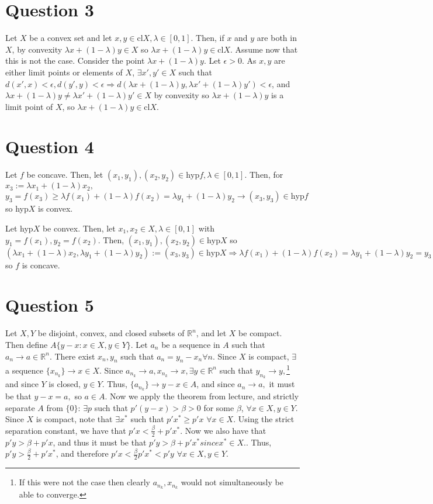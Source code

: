 \documentclass[11pt]{article} %
\begin{document}
\section{Question 3}
Let $X$ be a convex set and let $x,y\in \text{cl} X,\lambda \in [0,1].$ Then, if $x$ and $y$ are both in $X$, by convexity $\lambda x+(1-\lambda)y\in X$ so $\lambda x+(1-\lambda)y\in \text{cl}X$. Assume now that this is not the case. Consider the point $\lambda x+(1-\lambda)y.$ Let $\epsilon>0.$ As $x,y$ are either limit points or elements of $X$, $\exists x',y'\in X$ such that $d(x',x)<\epsilon,d(y',y)<\epsilon \Rightarrow d(\lambda x+(1-\lambda)y,\lambda x'+(1-\lambda)y')<\epsilon$, and $\lambda x+(1-\lambda)y \neq \lambda x'+(1-\lambda)y' \in X$ by convexity so $\lambda x+(1-\lambda)y$ is a limit point of $X$, so $\lambda x+(1-\lambda)y \in \text{cl}X$.

\section{Question 4}
Let $f$ be concave. Then, let $(x_1,y_1),(x_2,y_2) \in \text{hyp} f, \lambda \in [0,1].$ Then, for $x_3:=\lambda x_1 +(1-\lambda )x_2,$ $y_3 =f(x_3)\geq \lambda f(x_1) + (1-\lambda) f(x_2) = \lambda y_1 + (1-\lambda)y_2 \rightarrow (x_3,y_3) \in \text{hyp} f$ so hyp$X$ is convex.

Let hyp$X$ be convex. Then, let $x_1,x_2 \in X,\lambda \in [0,1]$ with $y_1 = f(x_1),y_2 = f(x_2)$. Then, $(x_1,y_1),(x_2,y_2) \in \text{hyp} X$ so $(\lambda x_1 + (1-\lambda)x_2 , \lambda y_1 + (1-\lambda)y_2):= (x_3,y_3) \in \text{hyp}X \Rightarrow \lambda f(x_1) + (1-\lambda)f(x_2)= \lambda y_1 + (1-\lambda)y_2 =y_3 \leq f(x_3) = f(\lambda x_1 + (1-\lambda)x_2 )$ so $f$ is concave.

\section{Question 5}
Let $X,Y$ be disjoint, convex, and closed subsets of $\mathbb{R}^n$, and let $X$ be compact. Then define $A \{ y-x : x\in X, y \in Y\}.$ Let $a_n$ be a sequence in $A$ such that $a_n \rightarrow a \in \mathbb{R}^n$. There exist $x_n,y_n$ such that $a_n = y_n - x_n \forall n.$ Since $X$ is compact, $\exists$ a sequence $\{ x_{n_k}\}\rightarrow x\in X$. Since $a_{n_k} \rightarrow a,x_{n_k} \rightarrow x, \exists y \in \mathbb{R}^n$ such that $y_{n_k} \rightarrow y,$\footnote{If this were not the case then clearly $a_{n_k},x_{n_k}$ would not simultaneously be able to converge.} and since $Y$ is closed, $y\in Y$. Thus, $\{ a_{n_k} \} \rightarrow y-x \in A$, and since $a_n \rightarrow a,$ it must be that $y-x = a,$ so $a \in A$. Now we apply the theorem from lecture, and strictly separate $A$ from $\{ 0\}$: $\exists p$ such that $p'(y-x)>\beta>0$ for some $\beta$, $\forall x\in X,y\in Y.$ Since $X$ is compact, note that $\exists x^{*}$ such that $p'x^{*}\geq p'x$ $\forall x\in X$. Using the strict separation constant, we have that $p'x<\frac{\beta}{2}+p'x^{*}.$ Now we also have that $p'y>\beta +p'x$, and thus it must be that $p'y>\beta +p'x^{*} since x^{*}\in X.$. Thus, $p'y>\frac{\beta}{2} +p'x^{*}$, and therefore $p'x<\frac{\beta}{2}p'x^{*}<p'y$ $\forall x\in X, y\in Y.$
\end{document}
